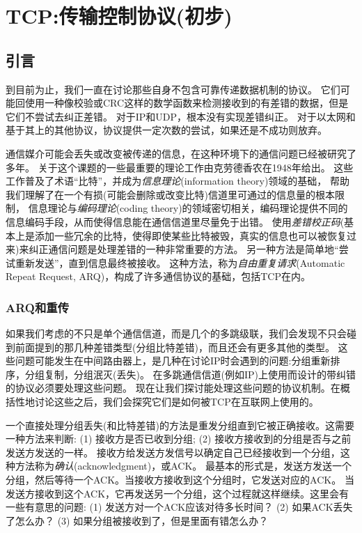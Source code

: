 \documentclass{../main.tex}{subfiles}
\begin{document}
\chapter{TCP:传输控制协议(初步)}
\section{引言}
到目前为止，我们一直在讨论那些自身不包含可靠传递数据机制的协议。
它们可能回使用一种像校验或CRC这样的数学函数来检测接收到的有差错的数据，但是它们不尝试去纠正差错。
对于IP和UDP，根本没有实现差错纠正。
对于以太网和基于其上的其他协议，协议提供一定次数的尝试，如果还是不成功则放弃。

通信媒介可能会丢失或改变被传递的信息，在这种环境下的通信问题已经被研究了多年。
关于这个课题的一些最重要的理论工作由克劳德\textperiodcentered 香农在1948年给出\cite{Shannon1948A}。
这些工作普及了术语``比特''，并成为\emph{信息理论}(information theory)领域的基础，
帮助我们理解了在一个有损(可能会删除或改变比特)信道里可通过的信息量的根本限制，
信息理论与\emph{编码理论}(coding theory)的领域密切相关，编码理论提供不同的信息编码手段，从而使得信息能在通信信道里尽量免于出错。
使用\emph{差错校正码}(基本上是添加一些冗余的比特，使得即使某些比特被毁，真实的信息也可以被恢复过来)来纠正通信问题是处理差错的一种非常重要的方法。
另一种方法是简单地``尝试重新发送''，直到信息最终被接收。
这种方法，称为\emph{自由重复请求}(Automatic Repeat Request, ARQ)，构成了许多通信协议的基础，包括TCP在内。

\subsection{ARQ和重传}
如果我们考虑的不只是单个通信信道，而是几个的多跳级联，我们会发现不只会碰到前面提到的那几种差错类型(分组比特差错)，而且还会有更多其他的类型。
这些问题可能发生在中间路由器上，是几种在讨论IP时会遇到的问题:分组重新排序，分组复制，分组泯灭(丢失)。
在多跳通信信道(例如IP)上使用而设计的带纠错的协议必须要处理这些问题。
现在让我们探讨能处理这些问题的协议机制。在概括性地讨论这些之后，我们会探究它们是如何被TCP在互联网上使用的。

%
一个直接处理分组丢失(和比特差错)的方法是重发分组直到它被正确接收。这需要一种方法来判断:
(1) 接收方是否已收到分组; (2) 接收方接收到的分组是否与之前发送方发送的一样。
接收方给发送方发信号以确定自己已经接收到一个分组，这种方法称为\emph{确认}(acknowledgment)，或ACK。
最基本的形式是，发送方发送一个分组，然后等待一个ACK。当接收方接收到这个分组时，它发送对应的ACK。
当发送方接收到这个ACK，它再发送另一个分组，这个过程就这样继续。这里会有一些有意思的问题:
(1) 发送方对一个ACK应该对待多长时间？ (2) 如果ACK丢失了怎么办？ (3) 如果分组被接收到了，但是里面有错怎么办？
\end{document}
